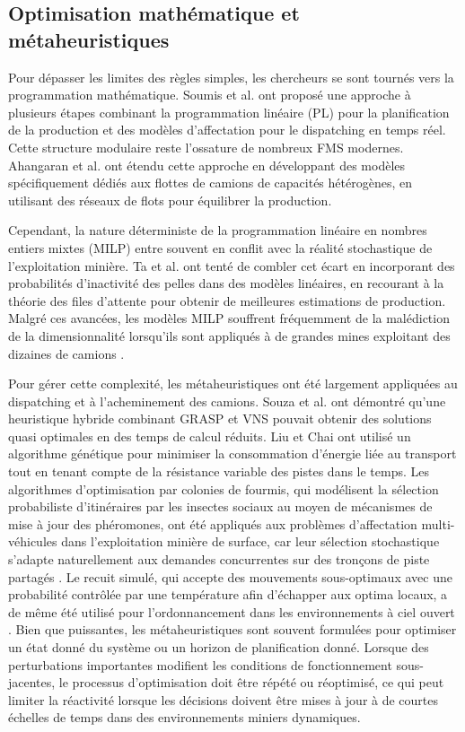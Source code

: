 \documentclass[11pt,a4paper]{article}
\begin{document}
\subsection{Optimisation mathématique et métaheuristiques}

Pour dépasser les limites des règles simples, les chercheurs se sont tournés vers la programmation mathématique. Soumis et al. \cite{Soumis1989} ont proposé une approche à plusieurs étapes combinant la programmation linéaire (PL) pour la planification de la production et des modèles d'affectation pour le dispatching en temps réel. Cette structure modulaire reste l'ossature de nombreux FMS modernes. Ahangaran et al. \cite{Ahangaran2012} ont étendu cette approche en développant des modèles spécifiquement dédiés aux flottes de camions de capacités hétérogènes, en utilisant des réseaux de flots pour équilibrer la production.

Cependant, la nature déterministe de la programmation linéaire en nombres entiers mixtes (MILP) entre souvent en conflit avec la réalité stochastique de l'exploitation minière. Ta et al. \cite{ChungTa2013} ont tenté de combler cet écart en incorporant des probabilités d'inactivité des pelles dans des modèles linéaires, en recourant à la théorie des files d'attente pour obtenir de meilleures estimations de production. Malgré ces avancées, les modèles MILP souffrent fréquemment de la malédiction de la dimensionnalité lorsqu'ils sont appliqués à de grandes mines exploitant des dizaines de camions \cite{AmandaSmith2020, ZhongxinWang2022}.

Pour gérer cette complexité, les métaheuristiques ont été largement appliquées au dispatching et à l'acheminement des camions. Souza et al. \cite{Souza2010} ont démontré qu'une heuristique hybride combinant GRASP et VNS pouvait obtenir des solutions quasi optimales en des temps de calcul réduits. Liu et Chai \cite{GuangweiLiu2019} ont utilisé un algorithme génétique pour minimiser la consommation d'énergie liée au transport tout en tenant compte de la résistance variable des pistes dans le temps. Les algorithmes d'optimisation par colonies de fourmis, qui modélisent la sélection probabiliste d'itinéraires par les insectes sociaux au moyen de mécanismes de mise à jour des phéromones, ont été appliqués aux problèmes d'affectation multi-véhicules dans l'exploitation minière de surface, car leur sélection stochastique s'adapte naturellement aux demandes concurrentes sur des tronçons de piste partagés \cite{ShivPrakashUpadhyay2017}. Le recuit simulé, qui accepte des mouvements sous-optimaux avec une probabilité contrôlée par une température afin d'échapper aux optima locaux, a de même été utilisé pour l'ordonnancement dans les environnements à ciel ouvert \cite{BurakOzdemir2019}. Bien que puissantes, les métaheuristiques sont souvent formulées pour optimiser un état donné du système ou un horizon de planification donné. Lorsque des perturbations importantes modifient les conditions de fonctionnement sous-jacentes, le processus d'optimisation doit être répété ou réoptimisé, ce qui peut limiter la réactivité lorsque les décisions doivent être mises à jour à de courtes échelles de temps dans des environnements miniers dynamiques.
\end{document}
